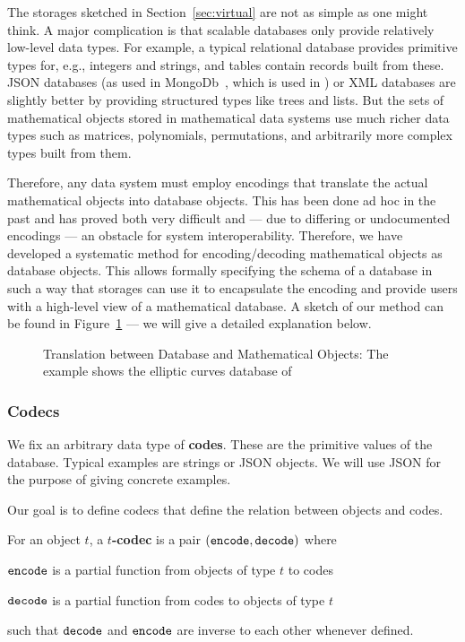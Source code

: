 The storages sketched in Section~\ref{sec:virtual} are not as simple as one might think.
A major complication is that scalable databases only provide relatively low-level data types.
For example, a typical relational database provides primitive types for, e.g., integers and strings, and tables contain records built from these.
JSON databases (as used in MongoDb~\cite{Chodorow:mdg10}, which is used in \LMFDB) or XML databases are slightly better by providing structured types like trees and lists.
But the sets of mathematical objects stored in mathematical data systems use much richer data types such as matrices, polynomials, permutations, and arbitrarily more complex types built from them.

Therefore, any data system must employ encodings that translate the actual mathematical objects into database objects.
This has been done ad hoc in the past and has proved both very difficult and --- due to differing or undocumented encodings --- an obstacle for system interoperability.
Therefore, we have developed a systematic method for encoding/decoding mathematical objects as database objects.
This allows formally specifying the schema of a database in such a way that \MMT storages can use it to encapsulate the encoding and provide users with a high-level view of a mathematical database.
A sketch of our method can be found in Figure~\ref{fig:codec_arch} --- we will give a
detailed explanation below.

\begin{figure}[ht]\centering
  \providecommand\myxscale{3.2}
  \providecommand\myyscale{1.5}
  \providecommand\myfontsize{\footnotesize}
  
  \caption{Translation between Database and Mathematical Objects: The example shows the elliptic curves database of \LMFDB}
  \label{fig:codec_arch}
\end{figure}

\subsubsection{Codecs}

We fix an arbitrary data type of \textbf{codes}.  These are the primitive values of the
database.  Typical examples are strings or JSON objects.  We will use JSON for the purpose
of giving concrete examples.

Our goal is to define codecs that define the relation between \MMT objects and codes.

\begin{mydef}[Codec]
  For an \MMT object $t$, a \textbf{$t$-codec} is a pair $(\enc, \dec)$ where
  \begin{compactitem}
   \item $\enc$ is a partial function from \MMT objects of type $t$ to codes
   \item $\dec$ is a partial function from codes to \MMT objects of type $t$
  \end{compactitem}
  such that $\dec$ and $\enc$ are inverse to each other whenever defined.
\end{mydef}

